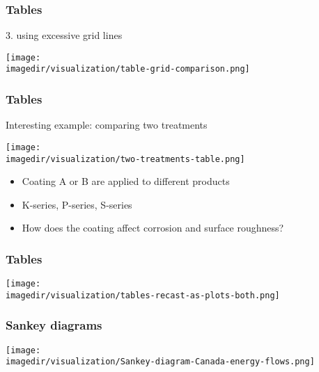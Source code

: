 \begin{frame}\frametitle{Tables}
	3. using excessive grid lines 
	\begin{center}
		\texttt{[image: \\imagedir/visualization/table-grid-comparison.png]}
	\end{center}
\end{frame}

\begin{frame}\frametitle{Tables}
	Interesting example: comparing two treatments
	\begin{center}
		\texttt{[image: \\imagedir/visualization/two-treatments-table.png]}
	\end{center}
	\begin{itemize}
		\item	Coating A or B are applied to different products
		\item	K-series, P-series, S-series
		\item	How does the coating affect corrosion and surface roughness?
	\end{itemize}
\end{frame}

\begin{frame}\frametitle{Tables}
	\begin{center}
		\texttt{[image: \\imagedir/visualization/tables-recast-as-plots-both.png]}
	\end{center}	
\end{frame}

\begin{frame}\frametitle{Sankey diagrams}
	\begin{center}
		\texttt{[image: \\imagedir/visualization/Sankey-diagram-Canada-energy-flows.png]}
	\end{center}
\end{frame}

% 	

